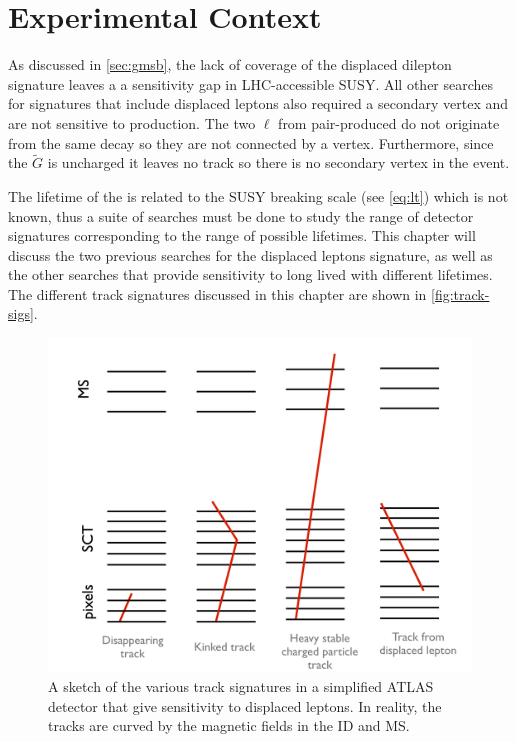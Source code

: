\chapter{Experimental Context}
\label{chap:context}

As discussed in \autoref{sec:gmsb}, the lack of coverage of the displaced dilepton signature leaves a a sensitivity gap in \ac{LHC}-accessible \ac{SUSY}. All other searches for signatures that include displaced leptons also required a secondary vertex and are not sensitive to \slep production. The two $\ell$ from pair-produced \slep do not originate from the same decay so they are not connected by a vertex. Furthermore, since the $\tilde{G}$ is uncharged it leaves no track so there is no secondary vertex in the event.

The lifetime of the \slep is related to the \ac{SUSY} breaking scale (see \autoref{eq:lt}) which is not known, thus a suite of searches must be done to study the range of detector signatures corresponding to the range of possible lifetimes. This chapter will discuss the two previous searches for the displaced leptons signature, as well as the other searches that provide sensitivity to long lived \slep with different lifetimes. The different track signatures discussed in this chapter are shown in \autoref{fig:track-sigs}.

\begin{figure}[!h]
\centering
\includegraphics[width=.7\textwidth]{figures/theory/track-signatures.png}
\caption{A sketch of the various track signatures in a simplified \ac{ATLAS} detector that give sensitivity to displaced leptons. In reality, the tracks are curved by the magnetic fields in the \ac{ID} and \ac{MS}.}
\label{fig:track-sigs}
\end{figure}



